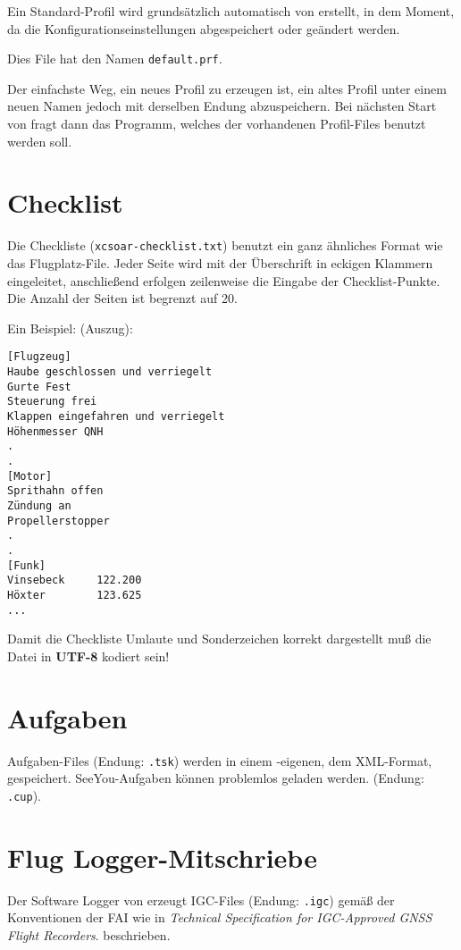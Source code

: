 Ein Standard-Profil wird grundsätzlich automatisch von  \xc erstellt, in dem Moment, da
die Konfigurationseinstellungen abgespeichert oder geändert werden.

Dies File hat den Namen  \verb|default.prf|.

Der einfachste Weg, ein neues Profil zu erzeugen ist, ein altes Profil unter einem neuen
Namen jedoch mit derselben Endung abzuspeichern. Bei nächsten Start von \xc  fragt dann das Programm, welches der vorhandenen Profil-Files benutzt werden soll.


\section{Checklist}\label{sec:checklist-file}

Die Checkliste  (\verb|xcsoar-checklist.txt|) benutzt ein ganz ähnliches Format
wie das Flugplatz-File. 
Jeder Seite wird mit der Überschrift in eckigen Klammern eingeleitet, anschließend erfolgen
zeilenweise die Eingabe der Checklist-Punkte. Die Anzahl der Seiten ist begrenzt auf 20.

Ein Beispiel: (Auszug):
\begin{verbatim}
[Flugzeug]
Haube geschlossen und verriegelt
Gurte Fest
Steuerung frei
Klappen eingefahren und verriegelt
Höhenmesser QNH
.
.
[Motor]
Sprithahn offen
Zündung an
Propellerstopper 
.
.
[Funk]
Vinsebeck     122.200
Höxter        123.625
...
\end{verbatim}
Damit die Checkliste Umlaute und Sonderzeichen korrekt dargestellt muß die Datei \warning 
in \textbf{UTF-8} kodiert sein!


\section{Aufgaben }

Aufgaben-Files  (Endung: \verb|.tsk|) werden in einem \xc -eigenen, dem  XML-Format, gespeichert.
SeeYou-Aufgaben können problemlos geladen werden. (Endung: \verb|.cup|).


\section{Flug Logger-Mitschriebe} \label{sec:logfiles}
Der Software Logger von \xc erzeugt  IGC-Files (Endung: \verb|.igc|)
gemäß der Konventionen der FAI wie in  {\em Technical Specification for IGC-Approved GNSS Flight Recorders}.
beschrieben.

